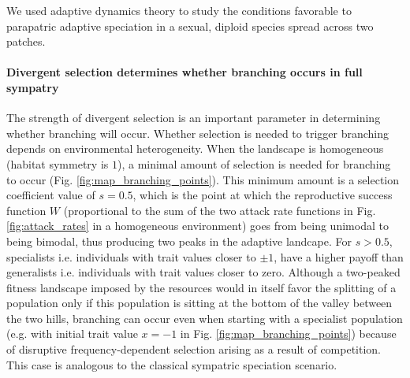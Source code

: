 We used adaptive dynamics theory to study the conditions favorable to parapatric adaptive speciation in a sexual, diploid species spread across two patches. 


\paragraph{Divergent selection determines whether branching occurs in full sympatry} The strength of divergent selection is an important parameter in determining whether branching will occur. Whether selection is needed to trigger branching depends on environmental heterogeneity. When the landscape is homogeneous (habitat symmetry  is $1$), a minimal amount of selection is needed for branching to occur (Fig. \ref{fig:map_branching_points}). This minimum amount is a selection coefficient value of $s = 0.5$, which is the point at which the reproductive success function $W$ (proportional to the sum of the two attack rate functions in Fig. \ref{fig:attack_rates} in a homogeneous environment) goes from being unimodal to being bimodal, thus producing two peaks in the adaptive landcape. For $s > 0.5$, specialists i.e. individuals with trait values closer to $\pm 1$, have a higher payoff than generalists i.e. individuals with trait values closer to zero. Although a two-peaked fitness landscape imposed by the resources would in itself favor the splitting of a population only if this population is sitting at the bottom of the valley between the two hills, branching can occur even when starting with a specialist population (e.g. with initial trait value $x = -1$ in Fig. \ref{fig:map_branching_points}) because of disruptive frequency-dependent selection arising as a result of competition. This case is analogous to the classical sympatric speciation scenario.\\


